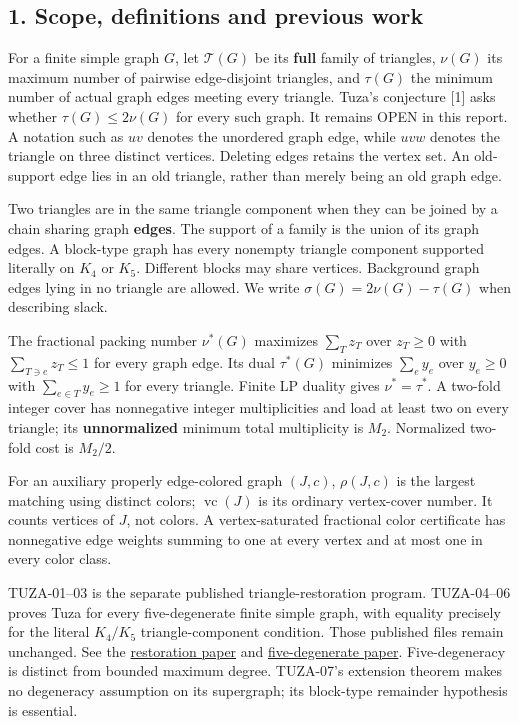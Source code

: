 \documentclass[11pt]{article}
\begin{document}
\subsection{1. Scope, definitions and previous work}\label{scope-definitions-and-previous-work}

For a finite simple graph \(G\), let \(\mathcal T(G)\) be its \textbf{full} family of triangles, \(\nu(G)\) its maximum number of pairwise edge-disjoint triangles, and \(\tau(G)\) the minimum number of actual graph edges meeting every triangle. Tuza's conjecture {[}1{]} asks whether \(\tau(G)\le2\nu(G)\) for every such graph. It remains OPEN in this report. A notation such as \(uv\) denotes the unordered graph edge, while \(uvw\) denotes the triangle on three distinct vertices. Deleting edges retains the vertex set. An old-support edge lies in an old triangle, rather than merely being an old graph edge.

Two triangles are in the same triangle component when they can be joined by a chain sharing graph \textbf{edges}. The support of a family is the union of its graph edges. A block-type graph has every nonempty triangle component supported literally on \(K_4\) or \(K_5\). Different blocks may share vertices. Background graph edges lying in no triangle are allowed. We write \(\sigma(G)=2\nu(G)-\tau(G)\) when describing slack.

The fractional packing number \(\nu^*(G)\) maximizes \(\sum_T z_T\) over \(z_T\ge0\) with \(\sum_{T\ni e}z_T\le1\) for every graph edge. Its dual \(\tau^*(G)\) minimizes \(\sum_e y_e\) over \(y_e\ge0\) with \(\sum_{e\in T}y_e\ge1\) for every triangle. Finite LP duality gives \(\nu^*=\tau^*\). A two-fold integer cover has nonnegative integer multiplicities and load at least two on every triangle; its \textbf{unnormalized} minimum total multiplicity is \(M_2\). Normalized two-fold cost is \(M_2/2\).

For an auxiliary properly edge-colored graph \((J,c)\), \(\rho(J,c)\) is the largest matching using distinct colors; \(\operatorname{vc}(J)\) is its ordinary vertex-cover number. It counts vertices of \(J\), not colors. A vertex-saturated fractional color certificate has nonnegative edge weights summing to one at every vertex and at most one in every color class.

TUZA-01--03 is the separate published triangle-restoration program. TUZA-04--06 proves Tuza for every five-degenerate finite simple graph, with equality precisely for the literal \(K_4/K_5\) triangle-component condition. Those published files remain unchanged. See the \href{https://github.com/pappa211/ai-math-experiments/blob/main/papers/tuza-triangle-restoration/main.md}{restoration paper} and \href{https://github.com/pappa211/ai-math-experiments/blob/main/papers/tuza-five-degenerate/main.md}{five-degenerate paper}. Five-degeneracy is distinct from bounded maximum degree. TUZA-07's extension theorem makes no degeneracy assumption on its supergraph; its block-type remainder hypothesis is essential.
\end{document}
